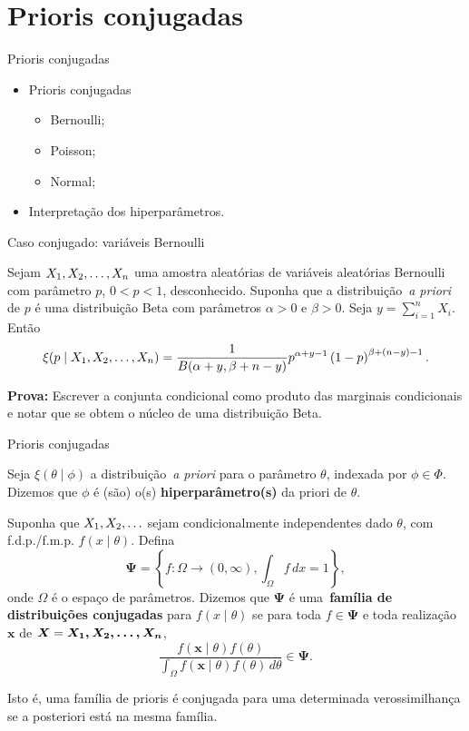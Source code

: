 \section*{Prioris conjugadas}
\begin{frame}{Prioris conjugadas}
 \begin{itemize}
  \item Prioris conjugadas
  \begin{itemize}
   \item Bernoulli;
   \item Poisson;
   \item Normal;
  \end{itemize}
\item Interpretação dos hiperparâmetros.
 \end{itemize}
\end{frame}

\begin{frame}{Caso conjugado: variáveis Bernoulli}
\begin{theo}
\label{thm:Bernoulli_posterior}
 Sejam $X_1, X_2, \ldots, X_n$ uma amostra aleatórias de variáveis aleatórias Bernoulli com parâmetro $p$, $ 0 < p < 1$, desconhecido.
 Suponha que a distribuição~\textit{a priori} de $p$ é uma distribuição Beta com parâmetros $\alpha > 0$ e $\beta > 0$.
 Seja $y = \sum_{i=1}^n X_i$. 
 Então
\[ \xi(p \mid X_1, X_2, \ldots, X_n) = \frac{1}{B(\alpha + y, \beta + n -y)} p^{\alpha + y- 1} \left(1-p\right)^{\beta + (n-y) - 1}.\]
\end{theo}
\textbf{Prova:}
 Escrever a conjunta condicional como produto das marginais condicionais e notar que se obtem o núcleo de uma distribuição Beta.
\end{frame}

\begin{frame}{Prioris conjugadas}

\begin{defn}
Seja $\xi(\theta \mid \phi)$ a distribuição~\textit{a priori} para o parâmetro $\theta$, indexada por $\phi \in \Phi$.
  Dizemos que $\phi$ é (são) o(s) \textbf{hiperparâmetro(s)} da priori de $\theta$.
 \end{defn}

\begin{defn}
Suponha que $X_1, X_2, \ldots$ sejam condicionalmente independentes dado $\theta$, com f.d.p./f.m.p. $f(x \mid \theta)$.
Defina
\[ \boldsymbol{\Psi} = \left\{ f : \Omega \to (0, \infty) ,  \int_{\Omega} f\, dx = 1  \right\}, \]
onde $\Omega$ é o espaço de parâmetros.
Dizemos que $\boldsymbol{\Psi}$ é uma~\textbf{família de distribuições conjugadas} para $f(x \mid \theta)$ se para toda $f \in \boldsymbol{\Psi}$ e toda realização $\boldsymbol{x}$ de $\boldsymbol X = \boldsymbol{X_1, X_2, \ldots, X_n}$,
\[ \frac{f(\boldsymbol{x} \mid \theta) f(\theta)}{\int_{\Omega} f(\boldsymbol{x} \mid \theta) f(\theta)\,d\theta} \in \boldsymbol{\Psi}. \]
\end{defn}
Isto é, uma família de prioris é conjugada para uma determinada verossimilhança se a posteriori está na mesma família.
\end{frame}

